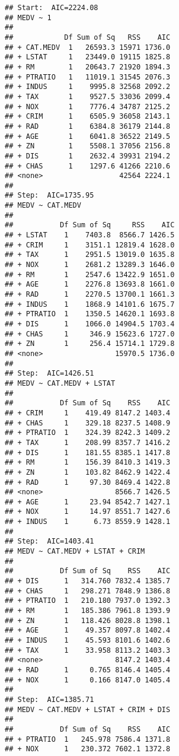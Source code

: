 \documentclass[
]{article}
\begin{document}
\begin{verbatim}
## Start:  AIC=2224.08
## MEDV ~ 1
## 
##            Df Sum of Sq   RSS    AIC
## + CAT.MEDV  1   26593.3 15971 1736.0
## + LSTAT     1   23449.0 19115 1825.8
## + RM        1   20643.7 21920 1894.3
## + PTRATIO   1   11019.1 31545 2076.3
## + INDUS     1    9995.8 32568 2092.2
## + TAX       1    9527.5 33036 2099.4
## + NOX       1    7776.4 34787 2125.2
## + CRIM      1    6505.9 36058 2143.1
## + RAD       1    6384.8 36179 2144.8
## + AGE       1    6041.8 36522 2149.5
## + ZN        1    5508.1 37056 2156.8
## + DIS       1    2632.4 39931 2194.2
## + CHAS      1    1297.6 41266 2210.6
## <none>                  42564 2224.1
## 
## Step:  AIC=1735.95
## MEDV ~ CAT.MEDV
## 
##           Df Sum of Sq     RSS    AIC
## + LSTAT    1    7403.8  8566.7 1426.5
## + CRIM     1    3151.1 12819.4 1628.0
## + TAX      1    2951.5 13019.0 1635.8
## + NOX      1    2681.2 13289.3 1646.0
## + RM       1    2547.6 13422.9 1651.0
## + AGE      1    2276.8 13693.8 1661.0
## + RAD      1    2270.5 13700.1 1661.3
## + INDUS    1    1868.9 14101.6 1675.7
## + PTRATIO  1    1350.5 14620.1 1693.8
## + DIS      1    1066.0 14904.5 1703.4
## + CHAS     1     346.9 15623.6 1727.0
## + ZN       1     256.4 15714.1 1729.8
## <none>                 15970.5 1736.0
## 
## Step:  AIC=1426.51
## MEDV ~ CAT.MEDV + LSTAT
## 
##           Df Sum of Sq    RSS    AIC
## + CRIM     1    419.49 8147.2 1403.4
## + CHAS     1    329.18 8237.5 1408.9
## + PTRATIO  1    324.39 8242.3 1409.2
## + TAX      1    208.99 8357.7 1416.2
## + DIS      1    181.55 8385.1 1417.8
## + RM       1    156.39 8410.3 1419.3
## + ZN       1    103.82 8462.9 1422.4
## + RAD      1     97.30 8469.4 1422.8
## <none>                 8566.7 1426.5
## + AGE      1     23.94 8542.7 1427.1
## + NOX      1     14.97 8551.7 1427.6
## + INDUS    1      6.73 8559.9 1428.1
## 
## Step:  AIC=1403.41
## MEDV ~ CAT.MEDV + LSTAT + CRIM
## 
##           Df Sum of Sq    RSS    AIC
## + DIS      1   314.760 7832.4 1385.7
## + CHAS     1   298.271 7848.9 1386.8
## + PTRATIO  1   210.180 7937.0 1392.3
## + RM       1   185.386 7961.8 1393.9
## + ZN       1   118.426 8028.8 1398.1
## + AGE      1    49.357 8097.8 1402.4
## + INDUS    1    45.593 8101.6 1402.6
## + TAX      1    33.958 8113.2 1403.3
## <none>                 8147.2 1403.4
## + RAD      1     0.765 8146.4 1405.4
## + NOX      1     0.166 8147.0 1405.4
## 
## Step:  AIC=1385.71
## MEDV ~ CAT.MEDV + LSTAT + CRIM + DIS
## 
##           Df Sum of Sq    RSS    AIC
## + PTRATIO  1   245.978 7586.4 1371.8
## + NOX      1   230.372 7602.1 1372.8

\end{verbatim}
\end{document}

